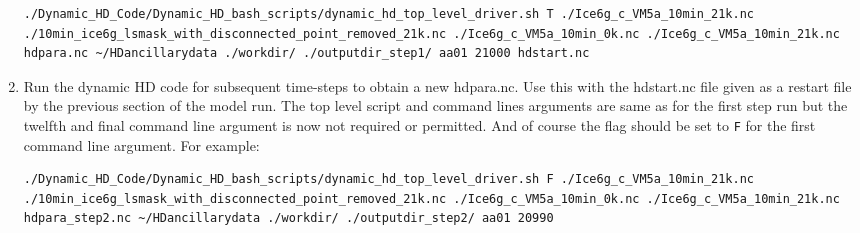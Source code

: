 \documentclass{article}
\begin{document}
\begin{enumerate}
\begin{lstlisting}[style=bash_input,breaklines=true]
./Dynamic_HD_Code/Dynamic_HD_bash_scripts/dynamic_hd_top_level_driver.sh T ./Ice6g_c_VM5a_10min_21k.nc ./10min_ice6g_lsmask_with_disconnected_point_removed_21k.nc ./Ice6g_c_VM5a_10min_0k.nc ./Ice6g_c_VM5a_10min_21k.nc hdpara.nc ~/HDancillarydata ./workdir/ ./outputdir_step1/ aa01 21000 hdstart.nc
\end{lstlisting}
\item Run the dynamic HD code for subsequent time-steps to obtain a new hdpara.nc. Use this with the hdstart.nc file given as a restart file by the previous section of the model run. The top level script and command lines arguments are same as for the first step run but the twelfth and final command line argument is now not required or permitted. And of course the flag should be set to \texttt{F} for the first command line argument. For example:
\begin{lstlisting}[style=bash_input,breaklines=true]
./Dynamic_HD_Code/Dynamic_HD_bash_scripts/dynamic_hd_top_level_driver.sh F ./Ice6g_c_VM5a_10min_21k.nc ./10min_ice6g_lsmask_with_disconnected_point_removed_21k.nc ./Ice6g_c_VM5a_10min_0k.nc ./Ice6g_c_VM5a_10min_21k.nc hdpara_step2.nc ~/HDancillarydata ./workdir/ ./outputdir_step2/ aa01 20990
\end{lstlisting}
\end{enumerate}
\end{document}
